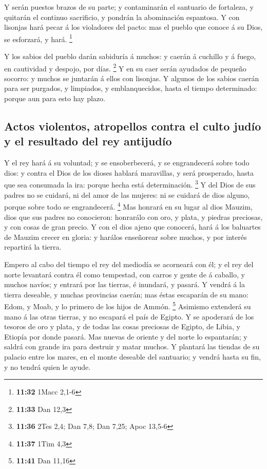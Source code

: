  Y serán puestos brazos de su parte; y contaminarán el
santuario de fortaleza, y quitarán el continuo sacrificio, y pondrán la
abominación espantosa.  Y con lisonjas hará pecar á los
violadores del pacto: mas el pueblo que conoce á su Dios, se esforzará,
y hará. \footnote{\textbf{11:32} 1Macc 2,1-6}

 Y los sabios del pueblo darán sabiduría á muchos: y caerán
á cuchillo y á fuego, en cautividad y despojo, por días. \footnote{\textbf{11:33}
  Dan 12,3}  Y en su caer serán ayudados de pequeño
socorro: y muchos se juntarán á ellos con lisonjas.  Y
algunos de los sabios caerán para ser purgados, y limpiados, y
emblanquecidos, hasta el tiempo determinado: porque aun para esto hay
plazo.

\hypertarget{actos-violentos-atropellos-contra-el-culto-juduxedo-y-el-resultado-del-rey-antijuduxedo}{%
\subsection{Actos violentos, atropellos contra el culto judío y el
resultado del rey
antijudío}\label{actos-violentos-atropellos-contra-el-culto-juduxedo-y-el-resultado-del-rey-antijuduxedo}}

 Y el rey hará á su voluntad; y se ensoberbecerá, y se
engrandecerá sobre todo dios: y contra el Dios de los dioses hablará
maravillas, y será prosperado, hasta que sea consumada la ira: porque
hecha está determinación. \footnote{\textbf{11:36} 2Tes 2,4; Dan 7,8;
  Dan 7,25; Apoc 13,5-6}  Y del Dios de sus padres no se
cuidará, ni del amor de las mujeres: ni se cuidará de dios alguno,
porque sobre todo se engrandecerá. \footnote{\textbf{11:37} 1Tim 4,3}
 Mas honrará en su lugar al dios Mauzim, dios que sus
padres no conocieron: honrarálo con oro, y plata, y piedras preciosas, y
con cosas de gran precio.  Y con el dios ajeno que
conocerá, hará á los baluartes de Mauzim crecer en gloria: y harálos
enseñorear sobre muchos, y por interés repartirá la tierra.

 Empero al cabo del tiempo el rey del mediodía se acorneará
con él; y el rey del norte levantará contra él como tempestad, con
carros y gente de á caballo, y muchos navíos; y entrará por las tierras,
é inundará, y pasará.  Y vendrá á la tierra deseable, y
muchas provincias caerán; mas éstas escaparán de su mano: Edom, y Moab,
y lo primero de los hijos de Ammón. \footnote{\textbf{11:41} Dan 11,16}
 Asimismo extenderá su mano á las otras tierras, y no
escapará el país de Egipto.  Y se apoderará de los tesoros
de oro y plata, y de todas las cosas preciosas de Egipto, de Libia, y
Etiopía por donde pasará.  Mas nuevas de oriente y del
norte lo espantarán; y saldrá con grande ira para destruir y matar
muchos.  Y plantará las tiendas de su palacio entre los
mares, en el monte deseable del santuario; y vendrá hasta su fin, y no
tendrá quien le ayude.

